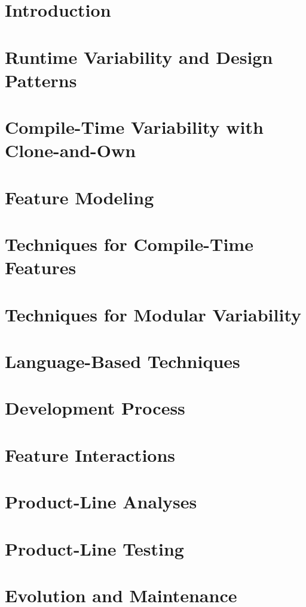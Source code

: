 \documentclass[
	aspectratio=169, %
	8pt, %
	handout, %
]{beamer}
\subtitle{Lecture Topics}
\author{Thomas Thüm, Timo Kehrer, Elias Kuiter, Sebastian Krieter}
\newcommand{\addlecture}[2]{\section{#2}\begin{frame}\end{frame}}
\begin{document}
	

\usebackgroundtemplate{}
\AtBeginSection[]{}


\addlecture{introduction}{Introduction}                               %
\addlecture{runtime}{Runtime Variability and Design Patterns}         %
\addlecture{cloneandown}{Compile-Time Variability with Clone-and-Own} %
\sectionend

\addlecture{modeling}{Feature Modeling}                      %
\addlecture{embedded}{Techniques for Compile-Time Features}  %
\addlecture{modular}{Techniques for Modular Variability}     %
\addlecture{languages}{Language-Based Techniques}            %
\addlecture{process}{Development Process}                    %
\sectionend

\addlecture{interactions}{Feature Interactions}  %
\addlecture{analyses}{Product-Line Analyses}     %
\addlecture{testing}{Product-Line Testing}       %
\addlecture{evonance}{Evolution and Maintenance} %
\end{document}
